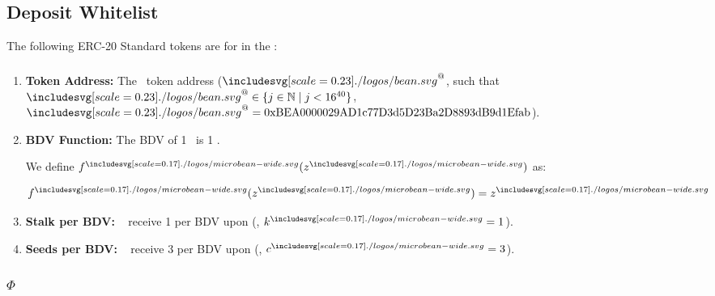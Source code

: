 \documentclass[class=article, crop=false]{standalone}
\begin{document}

\subsection{Deposit Whitelist}

The following ERC-20 Standard tokens are  for  in the :

\subsubsection{\Bean}

\begin{enumerate}
    \item \textbf{Token Address:} The \Bean\ token address ($\Bean^{@}$, such that $\Bean^{@} \in \{j \in \mathbb{N} \mid j < 16^{40} \}$, $\Bean^{@} = \\ \text{0xBEA0000029AD1c77D3d5D23Ba2D8893dB9d1Efab}$).
    
    \item \textbf{BDV Function:} The BDV of 1 \Bean\ is 1 \Bean. 

        We define $f^{\bean}(z^{\bean})$ as:
        
            $$
                f^{\bean}(z^{\bean}) = z^{\bean}
            $$
        
    \item \textbf{Stalk per BDV:} \Bean\  receive 1  per BDV upon  (, $k^{\bean} = 1$).
    
    \item \textbf{Seeds per BDV:} \Bean\  receive 3  per BDV upon  (, $c^{\bean} = 3$).
\end{enumerate}

\subsubsection{$\Phi$}
\end{document}
